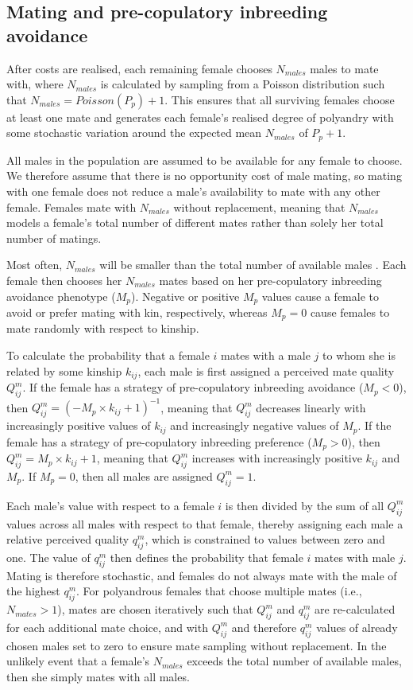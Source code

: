 \documentclass[10pt,letterpaper]{article}
\begin{document}
\subsection*{Mating and pre-copulatory inbreeding avoidance}

After costs are realised, each remaining female chooses $N_{males}$ males to mate with, where $N_{males}$ is calculated by sampling from a Poisson distribution such that $N_{males} = Poisson(P_{p}) + 1$. This ensures that all surviving females choose at least one mate and generates each female's realised degree of polyandry with some stochastic variation around the expected mean $N_{males}$ of $P_{p}+1$. 

All males in the population are assumed to be available for any female to choose. We therefore assume that there is no opportunity cost of male mating, so mating with one female does not reduce a male's availability to mate with any other female. Females mate with $N_{males}$ without replacement, meaning that $N_{males}$ models a female's total number of different mates rather than solely her total number of matings.

Most often, $N_{males}$ will be smaller than the total number of available males \cite[][]{Duthie}. Each female then chooses her $N_{males}$ mates based on her pre-copulatory inbreeding avoidance phenotype ($M_{p}$). Negative or positive $M_{p}$ values cause a female to avoid or prefer mating with kin, respectively, whereas $M_{p}=0$ cause females to mate randomly with respect to kinship.

To calculate the probability that a female $i$ mates with a male $j$ to whom she is related by some kinship $k_{ij}$, each male is first assigned a perceived mate quality $Q^{m}_{ij}$. If the female has a strategy of pre-copulatory inbreeding avoidance ($M_{p}<0$), then $Q^{m}_{ij} = (-M_{p} \times k_{ij} + 1)^{-1}$, meaning that $Q^{m}_{ij}$ decreases linearly with increasingly positive values of $k_{ij}$ and increasingly negative values of $M_{p}$. If the female has a strategy of pre-copulatory inbreeding preference ($M_{p}>0$), then $Q^{m}_{ij} = M_{p} \times k_{ij} + 1$, meaning that $Q^{m}_{ij}$ increases with increasingly positive $k_{ij}$ and $M_{p}$. If $M_{p}=0$, then all males are assigned $Q^{m}_{ij}=1$.

Each male's value with respect to a female $i$ is then divided by the sum of all $Q^{m}_{ij}$ values across all males with respect to that female, thereby assigning each male a relative perceived quality $q^{m}_{ij}$, which is constrained to values between zero and one. The value of $q^{m}_{ij}$ then defines the probability that female $i$ mates with male $j$. Mating is therefore stochastic, and females do not always mate with the male of the highest $q^{m}_{ij}$. For polyandrous females that choose multiple mates (i.e., $N_{mates}>1$), mates are chosen iteratively such that $Q^{m}_{ij}$ and $q^{m}_{ij}$ are re-calculated for each additional mate choice, and with $Q^{m}_{ij}$ and therefore $q^{m}_{ij}$ values of already chosen males set to zero to ensure mate sampling without replacement. In the unlikely event that a female's $N_{males}$ exceeds the total number of available males, then she simply mates with all males.
\end{document}
